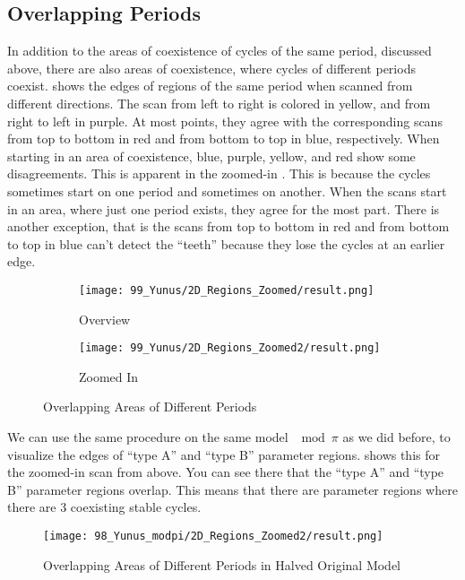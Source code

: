 \subsection{Overlapping Periods}

In addition to the areas of coexistence of cycles of the same period, discussed above, there are also areas of coexistence, where cycles of different periods coexist.
 shows the edges of regions of the same period when scanned from different directions.
The scan from left to right is colored in yellow, and from right to left in purple.
At most points, they agree with the corresponding scans from top to bottom in red and from bottom to top in blue, respectively.
When starting in an area of coexistence, blue, purple, yellow, and red show some disagreements.
This is apparent in the zoomed-in .
This is because the cycles sometimes start on one period and sometimes on another.
When the scans start in an area, where just one period exists, they agree for the most part.
There is another exception, that is the scans from top to bottom in red and from bottom to top in blue can't detect the ``teeth'' because they lose the cycles at an earlier edge.

\begin{figure}
	\centering
	\begin{subfigure}{0.4\textwidth}
		\texttt{[image: 99\_Yunus/2D\_Regions\_Zoomed/result.png]}
		\caption{Overview}
		\label{fig:yunus.period.regions}
	\end{subfigure}
	\begin{subfigure}{0.4\textwidth}
		\texttt{[image: 99\_Yunus/2D\_Regions\_Zoomed2/result.png]}
		\caption{Zoomed In}
		\label{fig:yunus.period.regions.zoomed}
	\end{subfigure}
	\caption{Overlapping Areas of Different Periods}
\end{figure}

We can use the same procedure on the same model $\mod \pi$ as we did before, to visualize the edges of ``type A'' and ``type B'' parameter regions.
 shows this for the zoomed-in scan from above.
You can see there that the ``type A'' and ``type B'' parameter regions overlap.
This means that there are parameter regions where there are 3 coexisting stable cycles.

\begin{figure}
	\centering
	\texttt{[image: 98\_Yunus\_modpi/2D\_Regions\_Zoomed2/result.png]}
	\caption{Overlapping Areas of Different Periods in Halved Original Model}
	\label{fig:yunus.halved.period.regions.zoomed}
\end{figure}
